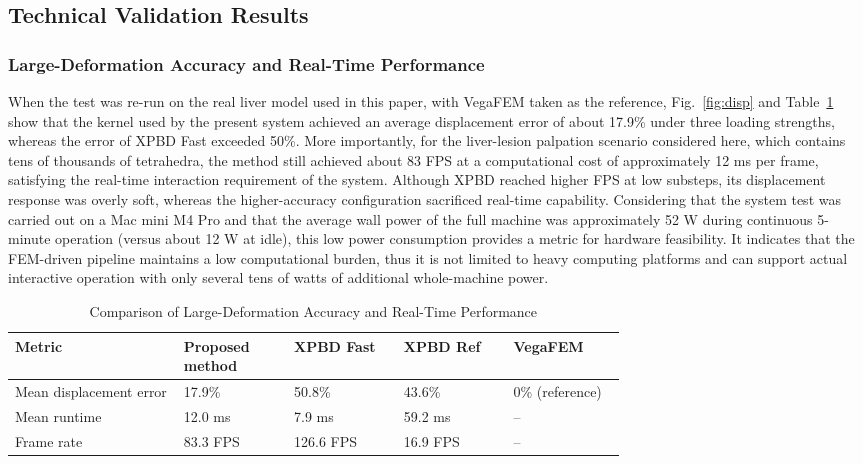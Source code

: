 \documentclass{ieeeaccess}
\begin{document}
\subsection{Technical Validation Results}
\subsubsection{Large-Deformation Accuracy and Real-Time Performance}
When the test was re-run on the real liver model used in this paper, with VegaFEM taken as the reference, Fig.~\ref{fig:disp} and Table~\ref{tab:disp} show that the kernel used by the present system achieved an average displacement error of about 17.9\% under three loading strengths, whereas the error of XPBD Fast exceeded 50\%. More importantly, for the liver-lesion palpation scenario considered here, which contains tens of thousands of tetrahedra, the method still achieved about 83 FPS at a computational cost of approximately 12 ms per frame, satisfying the real-time interaction requirement of the system. Although XPBD reached higher FPS at low substeps, its displacement response was overly soft, whereas the higher-accuracy configuration sacrificed real-time capability. Considering that the system test was carried out on a Mac mini M4 Pro and that the average wall power of the full machine was approximately 52 W during continuous 5-minute operation (versus about 12 W at idle), this low power consumption provides a metric for hardware feasibility. It indicates that the FEM-driven pipeline maintains a low computational burden, thus it is not limited to heavy computing platforms and can support actual interactive operation with only several tens of watts of additional whole-machine power.

\begin{table}[htbp]
\caption{Comparison of Large-Deformation Accuracy and Real-Time Performance}
\label{tab:disp}
\centering
\scriptsize
\renewcommand{\arraystretch}{1.15}
\setlength{\tabcolsep}{4pt}
\begin{tabular}{|p{0.20\linewidth}|p{0.13\linewidth}|p{0.13\linewidth}|p{0.13\linewidth}|p{0.12\linewidth}|}
\hline
Metric & Proposed method & XPBD Fast & XPBD Ref & VegaFEM \\
\hline
Mean displacement error & 17.9\% & 50.8\% & 43.6\% & 0\% (reference) \\
\hline
Mean runtime & 12.0 ms & 7.9 ms & 59.2 ms & -- \\
\hline
Frame rate & 83.3 FPS & 126.6 FPS & 16.9 FPS & -- \\
\hline
\end{tabular}
\end{table}
\end{document}
